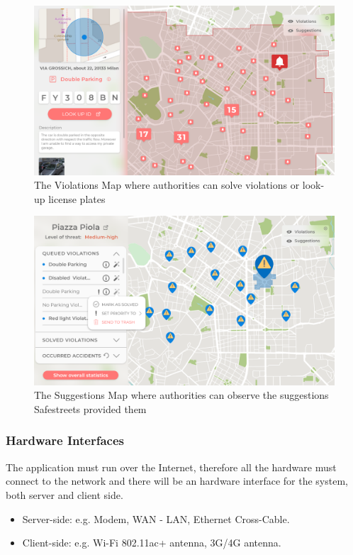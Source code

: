 \documentclass[12pt,a4paper]{article}
\begin{document}
					\begin{figure}[H]
						\centering
						\includegraphics[width=1.0\linewidth]{../assets/images/exports/authority/reports-list.png}
						\caption{The Violations Map where authorities can solve violations or look-up license plates}
						\label{}
					\end{figure}
 					\begin{figure}[H]
						\centering
						\includegraphics[width=1.0\linewidth]{../assets/images/exports/authority/suggestions-list.png}
						\caption{The Suggestions Map where authorities can observe the suggestions Safestreets provided them}
						\label{}
					\end{figure}
		\newpage
\subsubsection{Hardware Interfaces}
The application must run over the Internet, therefore all the hardware must connect to the network and there will be an hardware interface for the system, both server and client side.
		\begin{itemize}
			\item Server-side: e.g. Modem, WAN - LAN, Ethernet Cross-Cable.
			\item Client-side: e.g. Wi-Fi 802.11ac+ antenna, 3G/4G antenna.
		\end{itemize}
\end{document}
